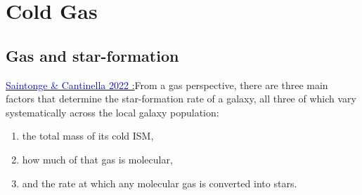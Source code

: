 \chapter{Cold Gas}


\section{Gas and star-formation}
\href{https://www.annualreviews.org/doi/pdf/10.1146/annurev-astro-021022-043545}{\textcolor{blue}{Saintonge \& Cantinella 2022} :}From a gas perspective, there are three main factors that determine the star-formation rate of a galaxy, all three of which vary systematically across the local galaxy population: 
\begin{enumerate}
    \item the total mass of its cold ISM,
    \item how much of that gas is molecular,
    \item and the rate at which any molecular gas is converted into stars.
\end{enumerate}   
